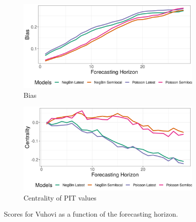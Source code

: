 \begin{figure}[H]
\begin{subfigure}{0.5\textwidth}
  \centering
  \includegraphics[width=\linewidth]{../output/Vuhovi_bias.png}  
  \caption{Bias}
  \label{fig:Vuhovi_scores_3}
\end{subfigure}
\begin{subfigure}{0.5\textwidth}
  \centering
  \includegraphics[width=\linewidth]{../output/Vuhovi_centrality.png}  
  \caption{Centrality of PIT values}
  \label{fig:Vuhovi_scores_4}
\end{subfigure}
  \caption{Scores for Vuhovi as a function of the forecasting horizon.}

  \label{fig:nat_scores}
\end{figure}
